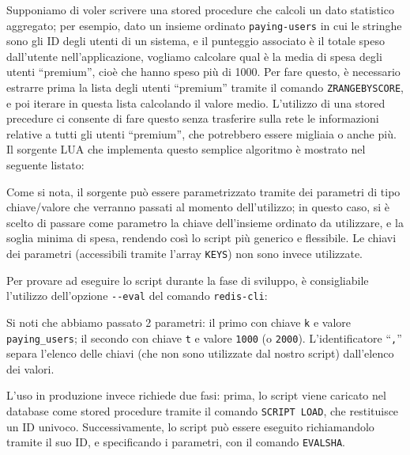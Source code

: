 Supponiamo di voler scrivere una stored procedure che calcoli un dato statistico aggregato; per
esempio, dato un insieme ordinato \verb|paying-users| in cui le stringhe sono gli ID degli utenti di
un sistema, e il punteggio associato è il totale speso dall'utente nell'applicazione, vogliamo
calcolare qual è la media di spesa degli utenti ``premium'', cioè che hanno speso più di
\SI{1000}{\EUR}. Per fare questo, è necessario estrarre prima la lista degli utenti ``premium''
tramite il comando \verb|ZRANGEBYSCORE|, e poi iterare in questa lista calcolando il valore medio.
L'utilizzo di una stored precedure ci consente di fare questo senza trasferire sulla rete le
informazioni relative a tutti gli utenti ``premium'', che potrebbero essere migliaia o anche più. Il
sorgente LUA che implementa questo semplice algoritmo è mostrato nel seguente listato:

\medskip
{}

Come si nota, il sorgente può essere parametrizzato tramite dei parametri di tipo chiave/valore
che verranno passati al momento dell'utilizzo; in questo caso, si è scelto di passare come parametro 
la chiave dell'insieme ordinato da utilizzare, e la soglia minima di spesa, rendendo così lo script 
più generico e flessibile. Le chiavi dei parametri (accessibili tramite l'array \verb|KEYS|) non
sono invece utilizzate.

Per provare ad eseguire lo script durante la fase di sviluppo, è consigliabile l'utilizzo
dell'opzione \verb|--eval| del comando \verb|redis-cli|:


Si noti che abbiamo passato 2 parametri: il primo con chiave \verb|k| e valore \verb|paying_users|;
il secondo con chiave \verb|t| e valore \verb|1000| (o \verb|2000|). L'identificatore ``\verb|,|''
separa l'elenco delle chiavi (che non sono utilizzate dal nostro script) dall'elenco dei valori.

L'uso in produzione invece richiede due fasi: prima, lo script viene caricato nel database
come stored procedure tramite il comando \verb|SCRIPT LOAD|, che restituisce un ID univoco. 
Successivamente, lo script può essere eseguito richiamandolo tramite il suo ID, e specificando 
i parametri, con il comando \verb|EVALSHA|.

